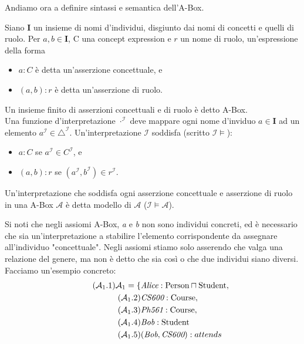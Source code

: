 Andiamo ora a definire sintassi e semantica dell'A-Box.
\begin{definition}
	\label{def:ABox}
	Siano $\mathbf{I}$ un insieme di nomi d'individui, disgiunto dai nomi di concetti e quelli di ruolo. Per $a, b \in \mathbf{I}$, C una concept expression e $r$ un nome di ruolo, un'espressione della forma
	\begin{itemize}
		\item $a : C$ è detta un'asserzione concettuale, e
		\item $(a, b) : r$ è detta un'asserzione di ruolo.
	\end{itemize}
	Un insieme finito di asserzioni concettuali e di ruolo è detto A-Box.\\
	Una funzione d'interpretazione $\cdot^\mathcal{I}$ deve mappare ogni nome d'inviduo $a \in \mathbf{I}$ ad un elemento $a^\mathcal{I} \in \triangle^\mathcal{I}$. Un'interpretazione $\mathcal{I}$ soddisfa (scritto $\mathcal{I} \models$):
	\begin{itemize}
		\item $a : C$ se $a^\mathcal{I} \in C^\mathcal{I}$, e
		\item $(a, b) : r$ se $(a^\mathcal{I}, b^\mathcal{I}) \in r^\mathcal{I}$.
	\end{itemize}
	Un'interpretazione che soddisfa ogni asserzione concettuale e asserzione di ruolo in una A-Box $\mathcal{A}$ è detta modello di $\mathcal{A}$ ($\mathcal{I} \models \mathcal{A}$).
\end{definition}
\noindent
Si noti che negli assiomi A-Box, \textit{a} e \textit{b} non sono individui concreti, ed è necessario che sia un’interpretazione a stabilire l'elemento corrispondente da assegnare all'individuo "concettuale". Negli assiomi stiamo solo asserendo che valga una relazione del genere, ma non è detto che sia così o che due individui siano diversi. Facciamo un'esempio concreto:
\begin{align}
	\tag{$\mathcal{A}_1$.1} \label{eq:A1.1}
	\mathcal{A}_1 = \{&\textit{Alice} : \text{Person} \sqcap \text{Student},\\
	\tag{$\mathcal{A}_1$.2} \label{eq:A1.2}
	&\textit{CS600} : \text{Course},\\
	\tag{$\mathcal{A}_1$.3} \label{eq:A1.3}
	&\textit{Ph561} : \text{Course}, \\
	\tag{$\mathcal{A}_1$.4} \label{eq:A1.4}	
	&\textit{Bob} : \text{Student}\\
	\tag{$\mathcal{A}_1$.5} \label{eq:A1.5}
	&(\textit{Bob}, \textit{CS600}) : attends\\
\end{align}
